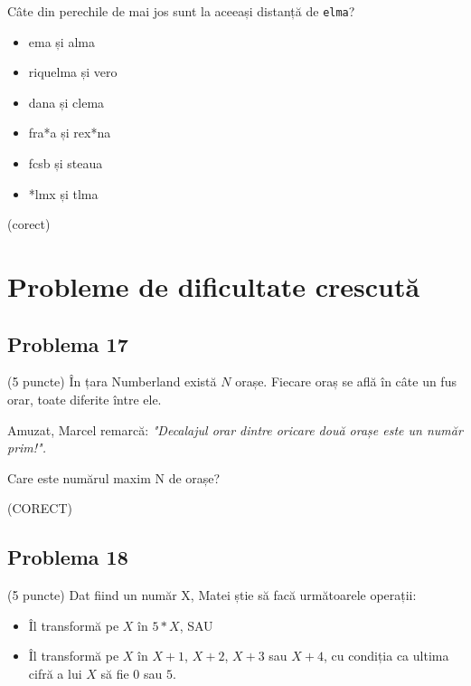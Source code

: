 \documentclass{exam}
\begin{document}
Câte din perechile de mai jos sunt la aceeași distanță de \texttt{elma}?

\begin{itemize}
    \item ema și alma
    \item riquelma și vero
    \item dana și clema
    \item fra*a și rex*na
    \item fcsb și steaua
    \item *lmx și tlma 
\end{itemize}


\begin{oneparchoices}
  (corect)
\end{oneparchoices}


\section{Probleme de dificultate crescută}

\subsection*{Problema 17}

(5 puncte) În țara Numberland există $N$ orașe. Fiecare oraș se află în câte un fus orar, toate diferite între ele.

Amuzat, Marcel remarcă: \textit{"Decalajul orar dintre oricare două orașe este un număr prim!".}

Care este numărul maxim N de orașe?



\begin{oneparchoices}
  (CORECT)
\end{oneparchoices}


\subsection*{Problema 18}

(5 puncte) Dat fiind un număr X, Matei știe să facă următoarele operații:
\begin{itemize}
    \item Îl transformă pe $X$ în $5 * X$, SAU
    \item Îl transformă pe $X$ în $X + 1$, $X + 2$, $X + 3$ sau $X + 4$, cu condiția ca ultima cifră a lui $X$ să fie $0$ sau $5$.
\end{itemize}
\end{document}
